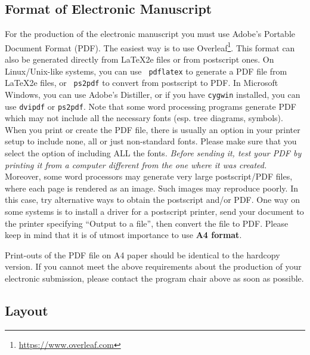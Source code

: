 \documentclass[11pt]{article}
\begin{document}
\subsection{Format of Electronic Manuscript}
\label{sect:pdf}

For the production of the electronic manuscript you must use Adobe's
Portable Document Format (PDF). The easiest way is to use Overleaf\footnote{\url{https://www.overleaf.com}}.
This format can also be generated directly from \LaTeX2e files or from
postscript ones. On Linux/Unix-like systems, you can use {\tt
  pdflatex} to generate a PDF file from \LaTeX2e files, or {\tt
  ps2pdf} to convert from postscript to PDF. 
In Microsoft Windows, you can use Adobe's Distiller, or if you have
\texttt{cygwin} installed, you can use \texttt{dvipdf} or
\texttt{ps2pdf}. Note that some word processing programs generate PDF
which may not include all the necessary fonts (esp. tree diagrams,
symbols). When you print or create the PDF file, there is usually an
option in your printer setup to include none, all or just non-standard
fonts.  Please make sure that you select the option of including ALL
the fonts. {\em Before sending it, test your PDF by printing it from a
  computer different from the one where it was created.} Moreover,
some word processors may generate very large postscript/PDF files,
where each page is rendered as an image. Such images may reproduce
poorly. In this case, try alternative ways to obtain the postscript
and/or PDF. One way on some systems is to install a driver for a
postscript printer, send your document to the printer specifying
``Output to a file'', then convert the file to PDF.
Please keep in mind that it is of utmost importance to use \textbf{A4 format}.


Print-outs of the PDF file on A4 paper should be identical to the
hardcopy version. If you cannot meet the above requirements about the
production of your electronic submission, please contact the
program chair above as soon as possible.


\subsection{Layout}
\label{ssec:layout}
\end{document}
